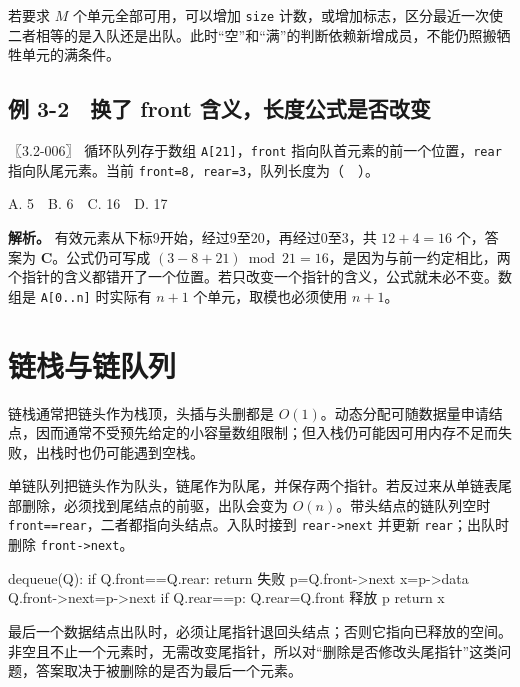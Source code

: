 若要求 \(M\) 个单元全部可用，可以增加 \texttt{size} 计数，或增加标志，区分最近一次使二者相等的是入队还是出队。此时``空''和``满''的判断依赖新增成员，不能仍照搬牺牲单元的满条件。

\subsection{例 3-2　换了 front 含义，长度公式是否改变}\label{DS03-ex2}

\begin{example}[配套例题]

〖3.2-006〗 循环队列存于数组 \texttt{A[21]}，\texttt{front} 指向队首元素的前一个位置，\texttt{rear} 指向队尾元素。当前 \texttt{front=\allowbreak{}8,\allowbreak{} rear=\allowbreak{}3}，队列长度为（　）。

A. 5　B. 6　C. 16　D. 17

\end{example}

\textbf{解析。} 有效元素从下标9开始，经过9至20，再经过0至3，共 \(12+4=16\) 个，答案为 \textbf{C}。公式仍可写成 \((3-8+21)\bmod21=16\)，是因为与前一约定相比，两个指针的含义都错开了一个位置。若只改变一个指针的含义，公式就未必不变。数组是 \texttt{A[0..n]} 时实际有 \(n+1\) 个单元，取模也必须使用 \(n+1\)。

\section{链栈与链队列}\label{DS03-04}

链栈通常把链头作为栈顶，头插与头删都是 \(O(1)\)。动态分配可随数据量申请结点，因而通常不受预先给定的小容量数组限制；但入栈仍可能因可用内存不足而失败，出栈时也仍可能遇到空栈。

单链队列把链头作为队头，链尾作为队尾，并保存两个指针。若反过来从单链表尾部删除，必须找到尾结点的前驱，出队会变为 \(O(n)\)。带头结点的链队列空时 \texttt{front=\allowbreak{}=\allowbreak{}rear}，二者都指向头结点。入队时接到 \texttt{rear->\allowbreak{}next} 并更新 \texttt{rear}；出队时删除 \texttt{front->\allowbreak{}next}。

\begin{codeblock}[language={}]
dequeue(Q):
    if Q.front==Q.rear: return 失败
    p=Q.front->next
    x=p->data
    Q.front->next=p->next
    if Q.rear==p: Q.rear=Q.front
    释放 p
    return x
\end{codeblock}

最后一个数据结点出队时，必须让尾指针退回头结点；否则它指向已释放的空间。非空且不止一个元素时，无需改变尾指针，所以对``删除是否修改头尾指针''这类问题，答案取决于被删除的是否为最后一个元素。

